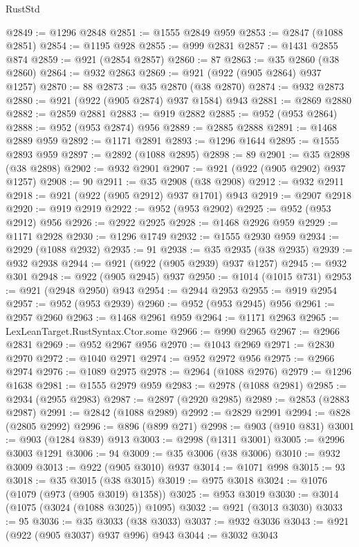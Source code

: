 \begin{lexlean}{RustStd}
\begin{coremodule}
@2849 := @1296 @2848
@2851 := @1555 @2849 @959
@2853 := @2847 (@1088 @2851)
@2854 := @1195 @928
@2855 := @999 @2831
@2857 := @1431 @2855 @874
@2859 := @921 (@2854 @2857)
@2860 := 87
@2863 := @35 @2860 (@38 @2860)
@2864 := @932 @2863
@2869 := @921 (@922 (@905 @2864) @937 @1257)
@2870 := 88
@2873 := @35 @2870 (@38 @2870)
@2874 := @932 @2873
@2880 := @921 (@922 (@905 @2874) @937 @1584) @943
@2881 := @2869 @2880
@2882 := @2859 @2881
@2883 := @919 @2882
@2885 := @952 (@953 @2864)
@2888 := @952 (@953 @2874) @956
@2889 := @2885 @2888
@2891 := @1468 @2889 @959
@2892 := @1171 @2891
@2893 := @1296 @1644
@2895 := @1555 @2893 @959
@2897 := @2892 (@1088 @2895)
@2898 := 89
@2901 := @35 @2898 (@38 @2898)
@2902 := @932 @2901
@2907 := @921 (@922 (@905 @2902) @937 @1257)
@2908 := 90
@2911 := @35 @2908 (@38 @2908)
@2912 := @932 @2911
@2918 := @921 (@922 (@905 @2912) @937 @1701) @943
@2919 := @2907 @2918
@2920 := @919 @2919
@2922 := @952 (@953 @2902)
@2925 := @952 (@953 @2912) @956
@2926 := @2922 @2925
@2928 := @1468 @2926 @959
@2929 := @1171 @2928
@2930 := @1296 @1749
@2932 := @1555 @2930 @959
@2934 := @2929 (@1088 @2932)
@2935 := 91
@2938 := @35 @2935 (@38 @2935)
@2939 := @932 @2938
@2944 := @921 (@922 (@905 @2939) @937 @1257)
@2945 := @932 @301
@2948 := @922 (@905 @2945) @937
@2950 := @1014 (@1015 @731)
@2953 := @921 (@2948 @2950) @943
@2954 := @2944 @2953
@2955 := @919 @2954
@2957 := @952 (@953 @2939)
@2960 := @952 (@953 @2945) @956
@2961 := @2957 @2960
@2963 := @1468 @2961 @959
@2964 := @1171 @2963
@2965 := LexLeanTarget.RustSyntax.Ctor.some
@2966 := @990 @2965
@2967 := @2966 @2831
@2969 := @952 @2967 @956
@2970 := @1043 @2969
@2971 := @2830 @2970
@2972 := @1040 @2971
@2974 := @952 @2972 @956
@2975 := @2966 @2974
@2976 := @1089 @2975
@2978 := @2964 (@1088 @2976)
@2979 := @1296 @1638
@2981 := @1555 @2979 @959
@2983 := @2978 (@1088 @2981)
@2985 := @2934 (@2955 @2983)
@2987 := @2897 (@2920 @2985)
@2989 := @2853 (@2883 @2987)
@2991 := @2842 (@1088 @2989)
@2992 := @2829 @2991
@2994 := @828 (@2805 @2992)
@2996 := @896 (@899 @271)
@2998 := @903 (@910 @831)
@3001 := @903 (@1284 @839) @913
@3003 := @2998 (@1311 @3001)
@3005 := @2996 @3003 @1291
@3006 := 94
@3009 := @35 @3006 (@38 @3006)
@3010 := @932 @3009
@3013 := @922 (@905 @3010) @937
@3014 := @1071 @998
@3015 := 93
@3018 := @35 @3015 (@38 @3015)
@3019 := @975 @3018
@3024 := @1076 (@1079 (@973 (@905 @3019) @1358))
@3025 := @953 @3019
@3030 := @3014 (@1075 (@3024 (@1088 @3025)) @1095)
@3032 := @921 (@3013 @3030)
@3033 := 95
@3036 := @35 @3033 (@38 @3033)
@3037 := @932 @3036
@3043 := @921 (@922 (@905 @3037) @937 @996) @943
@3044 := @3032 @3043

\end{coremodule}
\end{lexlean}
